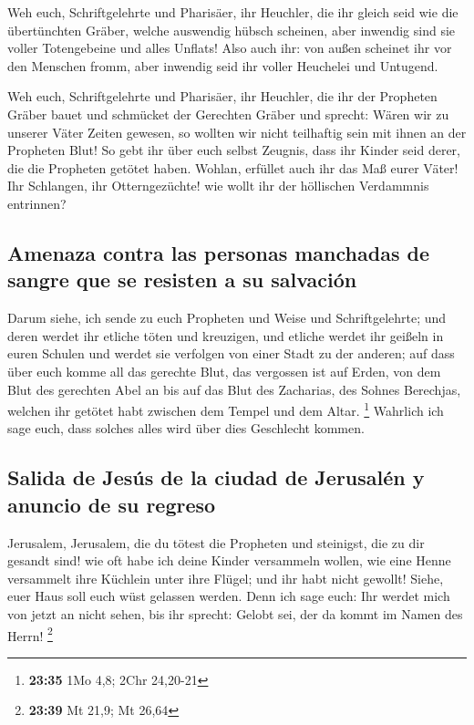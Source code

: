  Weh euch, Schriftgelehrte und Pharisäer, ihr Heuchler,
die ihr gleich seid wie die übertünchten Gräber, welche auswendig hübsch
scheinen, aber inwendig sind sie voller Totengebeine und alles Unflats!
 Also auch ihr: von außen scheinet ihr vor den Menschen
fromm, aber inwendig seid ihr voller Heuchelei und Untugend.

 Weh euch, Schriftgelehrte und Pharisäer, ihr Heuchler,
die ihr der Propheten Gräber bauet und schmücket der Gerechten Gräber
 und sprecht: Wären wir zu unserer Väter Zeiten gewesen,
so wollten wir nicht teilhaftig sein mit ihnen an der Propheten Blut!
 So gebt ihr über euch selbst Zeugnis, dass ihr Kinder
seid derer, die die Propheten getötet haben.  Wohlan,
erfüllet auch ihr das Maß eurer Väter!  Ihr Schlangen,
ihr Otterngezüchte! wie wollt ihr der höllischen Verdammnis entrinnen?

\hypertarget{amenaza-contra-las-personas-manchadas-de-sangre-que-se-resisten-a-su-salvaciuxf3n}{%
\subsection{Amenaza contra las personas manchadas de sangre que se
resisten a su
salvación}\label{amenaza-contra-las-personas-manchadas-de-sangre-que-se-resisten-a-su-salvaciuxf3n}}

 Darum siehe, ich sende zu euch Propheten und Weise und
Schriftgelehrte; und deren werdet ihr etliche töten und kreuzigen, und
etliche werdet ihr geißeln in euren Schulen und werdet sie verfolgen von
einer Stadt zu der anderen;  auf dass über euch komme all
das gerechte Blut, das vergossen ist auf Erden, von dem Blut des
gerechten Abel an bis auf das Blut des Zacharias, des Sohnes Berechjas,
welchen ihr getötet habt zwischen dem Tempel und dem Altar. \footnote{\textbf{23:35}
  1Mo 4,8; 2Chr 24,20-21}  Wahrlich ich sage euch, dass
solches alles wird über dies Geschlecht kommen.

\hypertarget{salida-de-jesuxfas-de-la-ciudad-de-jerusaluxe9n-y-anuncio-de-su-regreso}{%
\subsection{Salida de Jesús de la ciudad de Jerusalén y anuncio de su
regreso}\label{salida-de-jesuxfas-de-la-ciudad-de-jerusaluxe9n-y-anuncio-de-su-regreso}}

 Jerusalem, Jerusalem, die du tötest die Propheten und
steinigst, die zu dir gesandt sind! wie oft habe ich deine Kinder
versammeln wollen, wie eine Henne versammelt ihre Küchlein unter ihre
Flügel; und ihr habt nicht gewollt!  Siehe, euer Haus
soll euch wüst gelassen werden.  Denn ich sage euch: Ihr
werdet mich von jetzt an nicht sehen, bis ihr sprecht: Gelobt sei, der
da kommt im Namen des Herrn! \footnote{\textbf{23:39} Mt 21,9; Mt 26,64}

